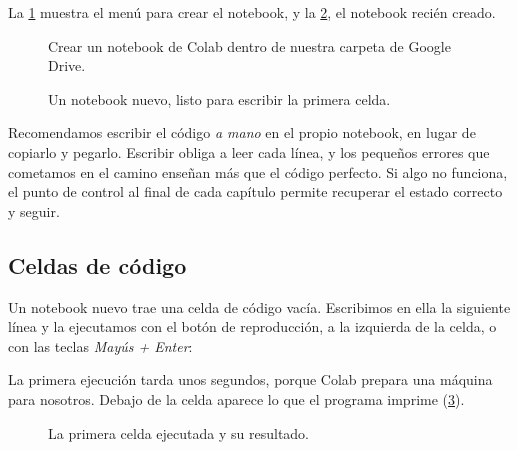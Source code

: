 La \cref{fig:colab_nuevo} muestra el menú para crear el notebook, y la
\cref{fig:colab_vacio}, el notebook recién creado.

\begin{figure}[ht]
  \centering
  \caption{Crear un notebook de Colab dentro de nuestra carpeta de Google
    Drive.}
  \label{fig:colab_nuevo}
\end{figure}

\begin{figure}[ht]
  \centering
  \caption{Un notebook nuevo, listo para escribir la primera celda.}
  \label{fig:colab_vacio}
\end{figure}

\begin{estrategia}
Recomendamos escribir el código \emph{a mano} en el propio notebook, en lugar
de copiarlo y pegarlo. Escribir obliga a leer cada línea, y los pequeños
errores que cometamos en el camino enseñan más que el código perfecto. Si algo
no funciona, el punto de control al final de cada capítulo permite recuperar
el estado correcto y seguir.
\end{estrategia}

\subsection*{Celdas de código}

Un notebook nuevo trae una celda de código vacía. Escribimos en ella la
siguiente línea y la ejecutamos con el botón de reproducción, a la izquierda
de la celda, o con las teclas \emph{Mayús + Enter}:

La primera ejecución tarda unos segundos, porque Colab prepara una máquina
para nosotros. Debajo de la celda aparece lo que el programa imprime
(\cref{fig:colab_primera_celda}).

\begin{figure}[ht]
  \centering
  \caption{La primera celda ejecutada y su resultado.}
  \label{fig:colab_primera_celda}
\end{figure}


